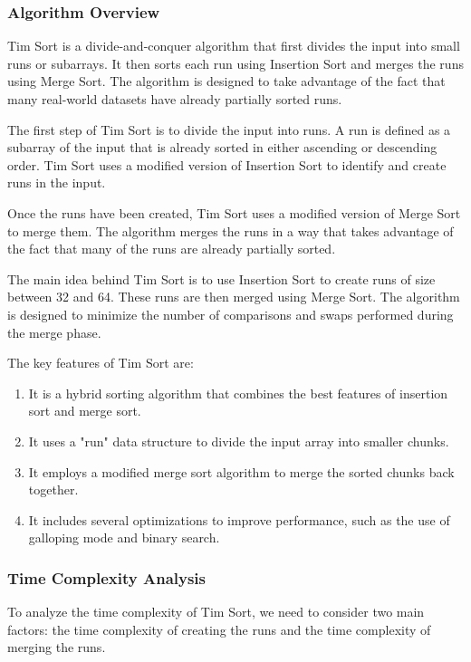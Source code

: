 \documentclass[a4paper, 11pt, oneside]{book} %
\begin{document}
\subsubsection{Algorithm Overview}
Tim Sort is a divide-and-conquer algorithm that first divides the input into small runs or subarrays. It then sorts each run using Insertion Sort and merges the runs using Merge Sort. The algorithm is designed to take advantage of the fact that many real-world datasets have already partially sorted runs.

The first step of Tim Sort is to divide the input into runs. A run is defined as a subarray of the input that is already sorted in either ascending or descending order. Tim Sort uses a modified version of Insertion Sort to identify and create runs in the input.

Once the runs have been created, Tim Sort uses a modified version of Merge Sort to merge them. The algorithm merges the runs in a way that takes advantage of the fact that many of the runs are already partially sorted.

The main idea behind Tim Sort is to use Insertion Sort to create runs of size between 32 and 64. These runs are then merged using Merge Sort. The algorithm is designed to minimize the number of comparisons and swaps performed during the merge phase.

The key features of Tim Sort are:
\begin{enumerate}
        \item It is a hybrid sorting algorithm that combines the best features of insertion sort and merge sort.
        \item It uses a "run" data structure to divide the input array into smaller chunks.
        \item It employs a modified merge sort algorithm to merge the sorted chunks back together.
        \item It includes several optimizations to improve performance, such as the use of galloping mode and binary search.
  
\end{enumerate}

\subsubsection{Time Complexity Analysis}
To analyze the time complexity of Tim Sort, we need to consider two main factors: the time complexity of creating the runs and the time complexity of merging the runs.
\end{document}
